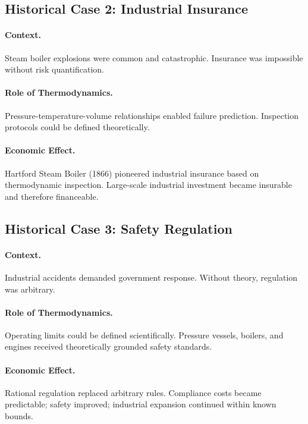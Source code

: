 \subsection{Historical Case 2: Industrial Insurance}

\paragraph{Context.} Steam boiler explosions were common and catastrophic.
Insurance was impossible without risk quantification.

\paragraph{Role of Thermodynamics.} Pressure-temperature-volume relationships
enabled failure prediction. Inspection protocols could be defined theoretically.

\paragraph{Economic Effect.} Hartford Steam Boiler (1866) pioneered industrial
insurance based on thermodynamic inspection. Large-scale industrial investment
became insurable and therefore financeable.

\subsection{Historical Case 3: Safety Regulation}

\paragraph{Context.} Industrial accidents demanded government response.
Without theory, regulation was arbitrary.

\paragraph{Role of Thermodynamics.} Operating limits could be defined
scientifically. Pressure vessels, boilers, and engines received theoretically
grounded safety standards.

\paragraph{Economic Effect.} Rational regulation replaced arbitrary rules.
Compliance costs became predictable; safety improved; industrial expansion
continued within known bounds.


